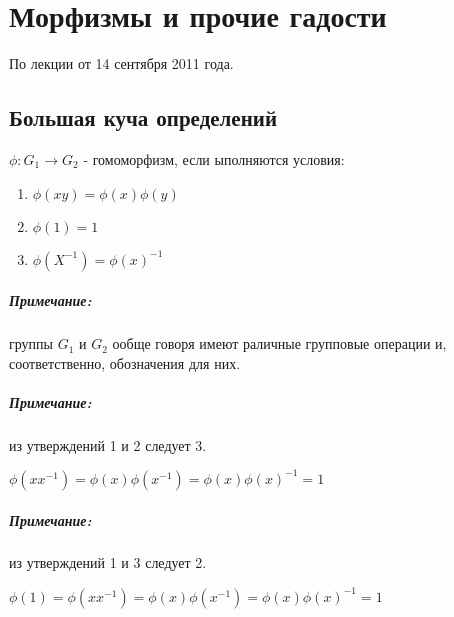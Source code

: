 \chapter{Морфизмы и прочие гадости}

По лекции от 14 сентября 2011 года.

\section{Большая куча определений}

\begin{Def}
	$\phi : G_1 \rightarrow G_2$ - гомоморфизм, если ыполняются условия:
	\begin{enumerate}
		\item $\phi \left( xy \right) = \phi \left( x \right) \phi \left( y \right)$

		\item $\phi \left( 1 \right) = 1$

		\item $\phi \left( X^{-1} \right) = \phi \left( x \right) ^{-1}$
	\end{enumerate}
\end{Def}

\paragraph{Примечание:} группы $G_1$ и $G_2$ ообще говоря имеют раличные групповые операции и, соответственно, обозначения для них.

\paragraph{Примечание:} из утверждений 1 и 2 следует 3.
\begin{Proof}
	$\phi \left(x x^{-1}\right) = \phi \left( x \right) \phi \left( x^{-1} \right) = \phi \left(x\right) \phi \left(x\right)^{-1} = 1$
\end{Proof}

\paragraph{Примечание:} из утверждений 1 и 3 следует 2.
\begin{Proof}
	$\phi \left(1\right) = \phi \left(x x^{-1}\right) = \phi \left( x \right) \phi \left( x^{-1} \right) = \phi \left(x\right) \phi \left(x\right)^{-1} = 1$
\end{Proof}

